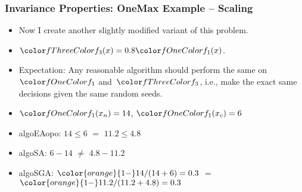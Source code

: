 \documentclass[aspectratio=169,mathserif,notheorems]{beamer}%
\begin{document}
%
%
\begin{frame}%
\frametitle{Invariance Properties: OneMax Example -- Scaling}%
\parbox{0.415\paperwidth}{%
\begin{itemize}%
\item Now I create another slightly modified variant of this problem.%
\item<2-> $\fn{3}(x)=0.8\fn{1}(x)$.%
\item<3-> Expectation: Any reasonable algorithm should perform the same on~$\fn{1}$ and~$\fn{3}$, i.e., make the exact same decisions given the same random seeds.%
%
\item<5-> $\fn{1}(x_n)=14$, $\fn{1}(x_c)=6$%
%
\item<7-> \gls{algoEAopo}: $14\leq6$ \textcolor{greenYesColor}{$\mathbf{=}$} $11.2\leq4.8$ \greenYes%
%
\item<8-> \gls{algoSA}: $6-14$ \textcolor{redNoColor}{$\mathbf{\neq}$} $4.8-11.2$ \redNo%
%
\item<9-> \gls{algoSGA}: ${\color{orange}{1-}}14/(14+6)=0.3$ \textcolor{greenYesColor}{$\mathbf{=}$} ${\color{orange}{1-}}11.2/(11.2+4.8)=0.3$ \greenYes%
\end{itemize}%
}%
%
%
%
%
%
%
%
%
%
\end{frame}%
%
\end{document}
